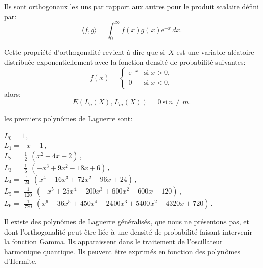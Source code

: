 \medskip
Ils sont orthogonaux les uns par rapport aux autres pour le produit 
scalaire défini par:
\begin{equation}
  \langle f,g \rangle = \int_0^\infty f(x) g(x) \mathrm{e}^{-x}\,dx.
\end{equation}

\medskip
Cette propriété d'orthogonalité revient à dire que si~$X$ est une variable aléatoire 
distribuée exponentiellement avec la fonction densité de probabilité suivantes:
\begin{equation}
  f(x)=\left\{\begin{matrix} \mathrm{e}^{-x} & \mbox{si}\ x>0, \\ 0 & \mbox{si}\ x<0, \end{matrix}\right.
\end{equation}
alors:
\begin{equation}
  E(L_n(X),L_m(X))=0\ \mbox{si}\ n\neq m. 
\end{equation}


\medskip
{}
les premiers polynômes de Laguerre sont:

\noindent
$L_0 =	1\,$,\\
$L_1= 	-x+1\,$,\\
$L_2= 	\begin{matrix}\frac12\end{matrix} (x^2-4x+2) \,$,\\
$L_3= 	\begin{matrix}\frac16\end{matrix} (-x^3+9x^2-18x+6) \,$,\\
$L_4= 	\begin{matrix}\frac1{24}\end{matrix} (x^4-16x^3+72x^2-96x+24) \,$,\\
$L_5= 	\begin{matrix}\frac1{120}\end{matrix} (-x^5+25x^4-200x^3+600x^2-600x+120) \,$,\\
$L_6= 	\begin{matrix}\frac1{720}\end{matrix} (x^6-36x^5+450x^4-2400x^3+5400x^2-4320x+720) \,$.

\medskip
Il existe des polynômes de Laguerre 
généralisés, que nous ne présentons pas,
et dont l'orthogonalité peut être liée à une densité de probabilité faisant intervenir
la fonction Gamma. Ils apparaissent dans le traitement de l'oscillateur harmonique quantique.
Ils peuvent être exprimés en fonction des polynômes d'Hermite.




